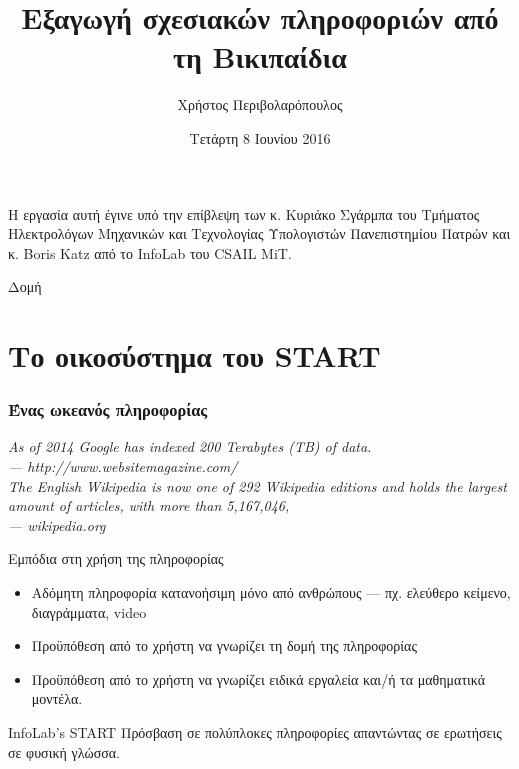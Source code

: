 \documentclass[bigger]{beamer}
\author{Χρήστος Περιβολαρόπουλος}
\date{Τετάρτη 8 Ιουνίου 2016}
\title{Εξαγωγή σχεσιακών πληροφοριών από τη Βικιπαίδια}
\begin{document}
\maketitle

\begin{frame}
  Η εργασία αυτή έγινε υπό την επίβλεψη των κ. Κυριάκο Σγάρμπα του
  Τμήματος Ηλεκτρολόγων Μηχανικών και Τεχνολογίας Υπολογιστών
  Πανεπιστημίου Πατρών και κ. Boris Katz από το InfoLab του CSAIL MiT.
\end{frame}

\begin{frame}{Δομή}
  \tableofcontents
\end{frame}

\section{Το οικοσύστημα του START}
\begin{frame}
  \frametitle{Ένας ωκεανός πληροφορίας}
  \textit{As of 2014 Google has indexed 200 Terabytes (TB) of data. \\
    \hfill --- http://www.websitemagazine.com/} \\

  \vfill
  \textit{The English Wikipedia is now one of 292 Wikipedia
    editions and holds the largest amount of articles, with more than
    5,167,046, \\ \hfill --- wikipedia.org }

  \vfiil
\end{frame}

\begin{frame}[fragile]{Εμπόδια στη χρήση της πληροφορίας}
  \begin{itemize}
  \item Αδόμητη πληροφορία κατανοήσιμη μόνο από ανθρώπους ---
    πχ. ελεύθερο κείμενο, διαγράμματα, video
  \item Προϋπόθεση από το χρήστη να γνωρίζει τη δομή της πληροφορίας
  \item Προϋπόθεση από το χρήστη να γνωρίζει ειδικά εργαλεία και/ή τα
    μαθηματικά μοντέλα.
  \end{itemize}
\end{frame}

\begin{frame}[fragile]{InfoLab's START}
  Πρόσβαση σε πολύπλοκες πληροφορίες απαντώντας σε ερωτήσεις σε φυσική
  γλώσσα.
\end{frame}
\end{document}
